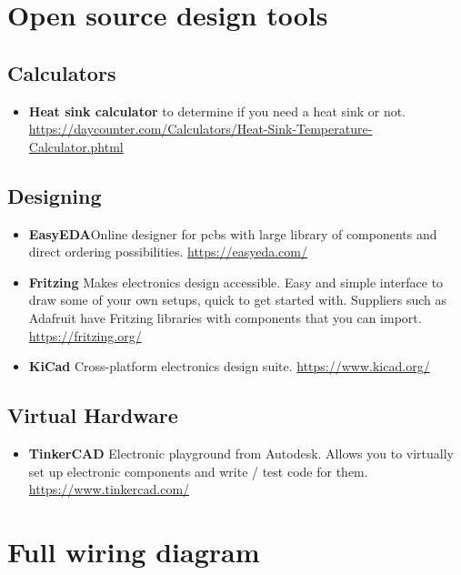 
\chapter{Open source design tools}

\section{Calculators}
\begin{itemize}
    \item \textbf{Heat sink calculator} to determine if you need a heat sink or not. \url{https://daycounter.com/Calculators/Heat-Sink-Temperature-Calculator.phtml} 
\end{itemize}

\section{Designing}
\begin{itemize}
    \item \textbf{EasyEDA}{Online designer for \acp{pcb} with large library of components and direct ordering possibilities. \url{https://easyeda.com/}}
    \item \textbf{Fritzing} Makes electronics design accessible. Easy and simple interface to draw some of your own setups, quick to get started with. Suppliers such as Adafruit have Fritzing libraries with components that you can import. \url{https://fritzing.org/}
    \item \textbf{KiCad} Cross-platform electronics design suite. \url{https://www.kicad.org/}
\end{itemize}

\section{Virtual Hardware}
\begin{itemize}
    \item \textbf{TinkerCAD} Electronic playground from Autodesk. Allows you to virtually set up electronic components and write / test code for them. \url{https://www.tinkercad.com/}
\end{itemize}


\chapter{Full wiring diagram}

